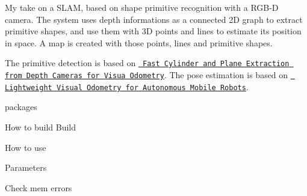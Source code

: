 My take on a SLAM, based on shape primitive recognition with a RGB-\/D camera. The system uses depth informations as a connected 2D graph to extract primitive shapes, and use them with 3D points and lines to estimate it\textquotesingle{}s position in space. A map is created with those points, lines and primitive shapes.

The primitive detection is based on \href{https://arxiv.org/pdf/1803.02380.pdf}{\texttt{ Fast Cylinder and Plane Extraction from Depth Cameras for Visua Odometry}}. The pose estimation is based on \href{https://www.ncbi.nlm.nih.gov/pmc/articles/PMC6165120/}{\texttt{ Lightweight Visual Odometry for Autonomous Mobile Robots}}.

packages 
\begin{DoxyCode}{0}

\end{DoxyCode}


How to build Build 
\begin{DoxyCode}{0}

\end{DoxyCode}


How to use 
\begin{DoxyCode}{0}

\end{DoxyCode}
 Parameters 
\begin{DoxyCode}{0}

\end{DoxyCode}


Check mem errors 
\begin{DoxyCode}{0}

\end{DoxyCode}
 